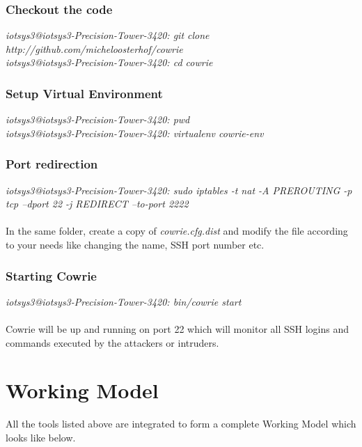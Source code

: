 \documentclass{article}
\begin{document}
\subsubsection{Checkout the code } 
\textit{{\color{blue}iotsys3@iotsys3-Precision-Tower-3420:} git clone http://github.com/micheloosterhof/cowrie}\\
\textit{{\color{blue}iotsys3@iotsys3-Precision-Tower-3420:} cd cowrie}


\subsubsection{Setup Virtual Environment } 
\textit{{\color{blue}iotsys3@iotsys3-Precision-Tower-3420:} pwd}\\
\textit{{\color{blue}iotsys3@iotsys3-Precision-Tower-3420:} virtualenv cowrie-env}

\subsubsection{Port redirection } 
\textit{{\color{blue}iotsys3@iotsys3-Precision-Tower-3420:} sudo iptables -t nat -A PREROUTING -p tcp --dport 22 -j REDIRECT --to-port 2222}

\paragraph{}
In the same folder, create a copy of \textit{cowrie.cfg.dist} and modify the file according to your needs like changing the name, SSH port number etc. 

\subsubsection{Starting Cowrie }
\textit{{\color{blue}iotsys3@iotsys3-Precision-Tower-3420:} bin/cowrie start}

\paragraph{}
Cowrie will be up and running on port 22 which will monitor all SSH logins and commands executed by the attackers or intruders.


\section{Working Model}

All the tools listed above are integrated to form a complete Working Model which looks like below.
\end{document}
